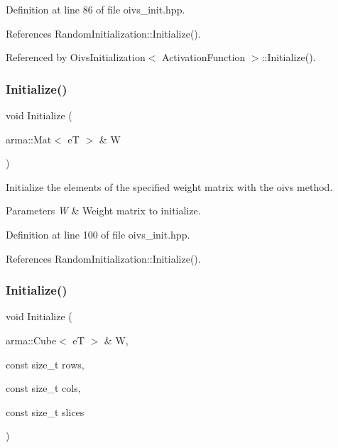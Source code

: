 Definition at line 86 of file oivs\+\_\+init.\+hpp.



References Random\+Initialization\+::\+Initialize().



Referenced by Oivs\+Initialization$<$ Activation\+Function $>$\+::\+Initialize().

\mbox{\label{classmlpack_1_1ann_1_1OivsInitialization_af2d770912321b8b9ca7b03ab98f735c0}} 
\subsubsection{Initialize()\hspace{0.1cm}{\footnotesize\ttfamily [2/4]}}
{\footnotesize\ttfamily void Initialize (\begin{DoxyParamCaption}\item[{arma\+::\+Mat$<$ eT $>$ \&}]{W }\end{DoxyParamCaption})\hspace{0.3cm}{\ttfamily [inline]}}



Initialize the elements of the specified weight matrix with the oivs method. 


\begin{DoxyParams}{Parameters}
{\em W} & Weight matrix to initialize. \\
\hline
\end{DoxyParams}


Definition at line 100 of file oivs\+\_\+init.\+hpp.



References Random\+Initialization\+::\+Initialize().

\mbox{\label{classmlpack_1_1ann_1_1OivsInitialization_a40a2b6466bdba0f6aab4eb92b6e65934}} 
\subsubsection{Initialize()\hspace{0.1cm}{\footnotesize\ttfamily [3/4]}}
{\footnotesize\ttfamily void Initialize (\begin{DoxyParamCaption}\item[{arma\+::\+Cube$<$ eT $>$ \&}]{W,  }\item[{const size\+\_\+t}]{rows,  }\item[{const size\+\_\+t}]{cols,  }\item[{const size\+\_\+t}]{slices }\end{DoxyParamCaption})\hspace{0.3cm}{\ttfamily [inline]}}



